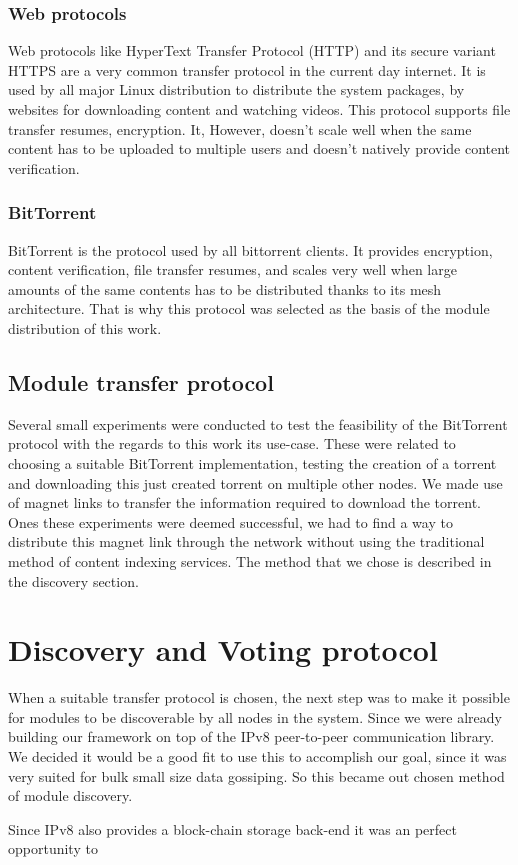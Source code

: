 \subsubsection{\textbf{Web protocols}}

Web protocols like HyperText Transfer Protocol (HTTP) and its secure variant HTTPS are a very common transfer protocol in the current day internet. It is used by all major Linux distribution to distribute the system packages, by websites for downloading content and watching videos. This protocol supports file transfer resumes, encryption. It, However, doesn't scale well when the same content has to be uploaded to multiple users and doesn't natively provide content verification.

\subsubsection{\textbf{BitTorrent}}

BitTorrent is the protocol used by all bittorrent clients. It provides encryption, content verification, file transfer resumes, and scales very well when large amounts of the same contents has to be distributed thanks to its mesh architecture. That is why this protocol was selected as the basis of the module distribution of this work.

\subsection{Module transfer protocol}
Several small experiments were conducted to test the feasibility of the BitTorrent protocol with the regards to this work its use-case. These were related to choosing a suitable BitTorrent implementation, testing the creation of a torrent and downloading this just created torrent on multiple other nodes. We made use of magnet links to transfer the information required to download the torrent. Ones these experiments were deemed successful, we had to find a way to distribute this magnet link through the network without using the traditional method of content indexing services. The method that we chose is described in the discovery section.

\section{Discovery and Voting protocol}

When a suitable transfer protocol is chosen, the next step was to make it possible for modules to be discoverable by all nodes in the system. Since we were already building our framework on top of the IPv8 peer-to-peer communication library. We decided it would be a good fit to use this to accomplish our goal, since it was very suited for bulk small size data gossiping. So this became out chosen method of module discovery.

Since IPv8 also provides a block-chain storage back-end it was an perfect opportunity to